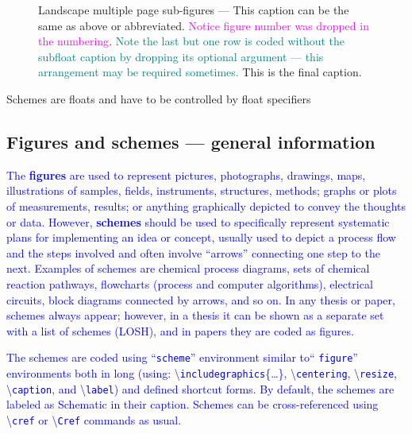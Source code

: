 \documentclass[phd,showgrids]{ndsu-thesis-2022}
\newcommand\italk[1]{\textcolor{blue}{#1}}  %
\newcommand\cmd[1]{\textbackslash\texttt{#1}}  %
\begin{document}
\begin{landscape}
\begin{figure}[t]
\captionsetup{singlelinecheck=false} %
\caption[]{Landscape multiple page sub-figures --- This caption can be the same as above or abbreviated.  \textcolor{magenta}{Notice figure number was dropped in the numbering}. \textcolor{teal}{Note the last but one row is coded without the subfloat caption by dropping its optional argument --- this arrangement may be required sometimes.} This is the final caption.} 
\end{figure}

\end{landscape}

{Schemes are floats and have to be controlled by float specifiers}

\subsection{Figures and schemes --- general information}\label{figs}

\italk{The \textbf{figures} are used to represent pictures, photographs, drawings, maps, illustrations of samples, fields, instruments, structures, methods; graphs or plots of measurements, results; or anything graphically depicted to convey the thoughts or data. However, \textbf{schemes} should be used to specifically represent systematic plans for implementing an idea or concept, usually used to depict a process flow and the steps involved and often involve ``arrows'' connecting one step to the next. Examples of schemes are chemical process diagrams, sets of chemical reaction pathways, flowcharts (process and computer algorithms), electrical circuits, block diagrams connected by arrows, and so on. In any thesis or paper, schemes always appear; however, in a thesis it can be shown as a separate set with a list of schemes (LOSH), and in papers they are coded as figures.}

\italk{The schemes are coded using ``\texttt{scheme}'' environment similar to`` \texttt{figure}'' environments both in long (using: \cmd{includegraphics}\{\ldots\}, \cmd{centering}, \cmd{resize}, \cmd{caption}, and \cmd{label}) and defined shortcut forms.  By default, the schemes are labeled as Schematic in their caption. Schemes can be cross-referenced using \cmd{cref} or \cmd{Cref} commands as usual.} 
\end{document}
